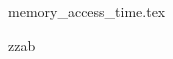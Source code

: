 \documentclass{exam}
\begin{document}


\begin{questions}

     \printanswers


     {memory_access_time.tex}


              \question  zzab



\end{questions}
\end{document}
